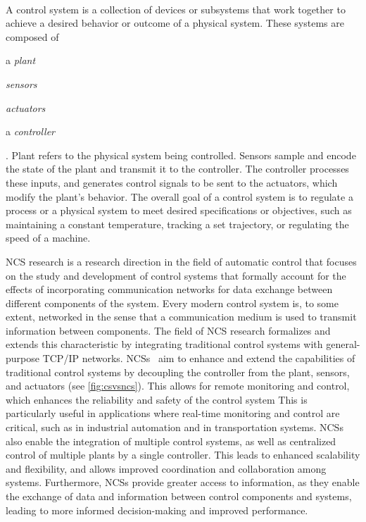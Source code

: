 \paragraph{}\label{background:ncs}

A control system is a collection of devices or subsystems that work together to achieve a desired behavior or outcome of a physical system.
These systems are composed of
\begin{inlineenum}
    \item a \emph{plant}
    \item \emph{sensors}
    \item \emph{actuators}
    \item a \emph{controller}
\end{inlineenum}.
Plant refers to the physical system being controlled.
Sensors sample and encode the state of the plant and transmit it to the controller.
The controller processes these inputs, and generates control signals to be sent to the actuators, which modify the plant's behavior.
The overall goal of a control system is to regulate a process or a physical system to meet desired specifications or objectives, such as maintaining a constant temperature, tracking a set trajectory, or regulating the speed of a machine.

\gls{NCS} research is a research direction in the field of automatic control that focuses on the study and development of control systems that formally account for the effects of incorporating communication networks for data exchange between different components of the system.
Every modern control system is, to some extent, networked in the sense that a communication medium is used to transmit information between components.
The field of \gls{NCS} research formalizes and extends this characteristic by integrating traditional control systems with general-purpose \acs{TCP}/\acs{IP} networks.
\glspl{NCS}~\cite{gupta2010networked} aim to enhance and extend the capabilities of traditional control systems by decoupling the controller from the plant, sensors, and actuators (see \cref{fig:csvsncs}).
This allows for remote monitoring and control, which enhances the reliability and safety of the control system
This is particularly useful in applications where real-time monitoring and control are critical, such as in industrial automation and in transportation systems.
\glspl{NCS} also enable the integration of multiple control systems, as well as centralized control of multiple plants by a single controller.
This leads to enhanced scalability and flexibility, and allows improved coordination and collaboration among systems.
Furthermore, \glspl{NCS} provide greater access to information, as they enable the exchange of data and information between control components and systems, leading to more informed decision-making and improved performance.

